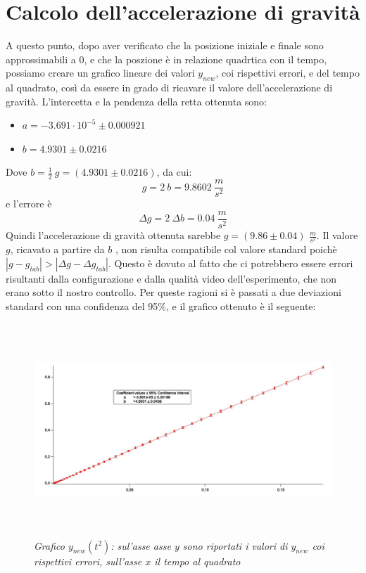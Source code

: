 \documentclass[12pt, a4paper]{article}
\begin{document}
\section{Calcolo dell'accelerazione di gravità}
A questo punto, dopo aver verificato che la posizione iniziale e finale sono approssimabili a $0$, e che la poszione è in relazione quadrtica con il tempo, possiamo creare un grafico lineare dei valori $y_{new}$, coi rispettivi errori, e del tempo al quadrato, così da essere in grado di ricavare il valore dell'accelerazione di gravità. L'intercetta e la pendenza della retta ottenuta sono:
\begin{itemize}
    \item $a=-3.691\cdot 10^{-5}\pm 0.000921$
    \item$b=4.9301\pm 0.0216$
\end{itemize}
Dove $\displaystyle b=\frac{1}{2}\ g=(4.9301\pm 0.0216)$, da cui:
\begin{equation*}
    g=2 \ b=9.8602 \ \frac{m}{s^2}
\end{equation*}
e l'errore è
\begin{equation*}
    \Delta g=2\ \Delta b=0.04 \ \frac{m}{s^2}
\end{equation*}
Quindi l'accelerazione di gravità ottenuta sarebbe $g=(9.86\pm0.04)$ $\frac{m}{s^2}$.
Il valore $g$, ricavato a partire da $b$ , non risulta compatibile col valore standard poichè $|g-g_{tab}|> |\Delta g-\Delta g_{tab}|$. Questo è dovuto al fatto che ci potrebbero essere errori risultanti dalla configurazione e dalla qualità video dell'esperimento, che non erano sotto il nostro controllo. Per queste ragioni si è passati a due deviazioni standard con una confidenza del 95\%, e il grafico ottenuto è il seguente:
  \begin{figure}[h!]
\centering
\includegraphics[width=170mm, height=80mm]{Immagini/Graphy_t^2.jpg}
\caption{\textit{{\footnotesize{Grafico $y_{new}(t^2)$: sul'asse asse $y$ sono riportati i valori di $y_{new}$ coi rispettivi errori, sull'asse $x$ il tempo al quadrato}}}}
\label{Grafico logaritmico}
\end{figure}
\end{document}
